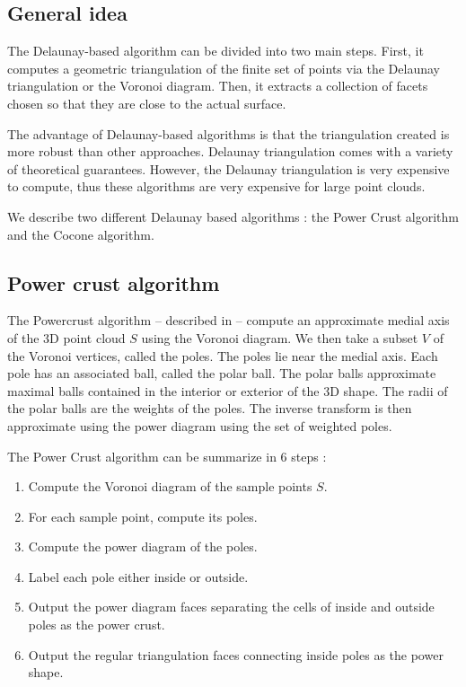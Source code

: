 \documentclass[a4paper]{article}
\begin{document}
\subsection{General idea}
The Delaunay-based algorithm can be divided into two main steps. First, it computes a geometric triangulation of the finite set of points via the Delaunay triangulation or the Voronoi diagram. Then, it extracts a collection of facets chosen so that they are close to the actual surface.

The advantage of Delaunay-based algorithms is that the triangulation created is more robust than other approaches. Delaunay triangulation comes with a variety of theoretical guarantees. However, the Delaunay triangulation is very expensive to compute, thus these algorithms are very expensive for large point clouds.

We describe two different Delaunay based algorithms : the Power Crust algorithm and the Cocone algorithm.

\subsection{Power crust algorithm}
\label{subsec:pca}
The Powercrust algorithm -- described in \cite{Powercrust}-- compute an approximate medial axis of the 3D point cloud $S$ using the Voronoi diagram. We then take a subset $V$ of the Voronoi vertices, called the poles. The poles lie near the medial axis. Each pole has an associated ball, called the polar ball. The polar balls approximate maximal balls contained in the interior or exterior of the 3D shape. The radii of the polar balls are the weights of the poles. The inverse transform is then approximate using the power diagram using the set of weighted poles.

The Power Crust algorithm can be summarize in 6 steps :
\begin{enumerate}
\item Compute the Voronoi diagram of the sample points $S$.
\item For each sample point, compute its poles.
\item Compute the power diagram of the poles.
\item Label each pole either inside or outside.
\item Output the power diagram faces separating the cells of inside and outside poles as the power crust.
\item Output the regular triangulation faces connecting inside poles as the power shape.
\end{enumerate}
\end{document}
